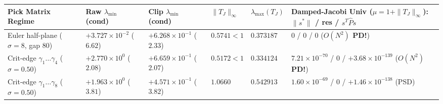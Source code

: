 \documentclass[
  11pt,
]{article}
\newcounter{none} %
\begin{document}
\begin{enumerate}
  {\def\LTcaptype{none} %
  \begin{longtable}[]{@{}
    >{\raggedright\arraybackslash}p{}
    >{\centering\arraybackslash}p{}
    >{\centering\arraybackslash}p{}
    >{\centering\arraybackslash}p{}
    >{\centering\arraybackslash}p{}
    >{\centering\arraybackslash}p{}@{}}
  \toprule\noalign{}
  \begin{minipage}[b]{\linewidth}\raggedright
  Pick Matrix Regime
  \end{minipage} & \begin{minipage}[b]{\linewidth}\centering
  Raw \(\lambda_{\min}\) (cond)
  \end{minipage} & \begin{minipage}[b]{\linewidth}\centering
  Clip \(\lambda_{\min}\) (cond)
  \end{minipage} & \begin{minipage}[b]{\linewidth}\centering
  \(\|T_J\|_\infty\)
  \end{minipage} & \begin{minipage}[b]{\linewidth}\centering
  \(\lambda_{\max}(T_J)\)
  \end{minipage} & \begin{minipage}[b]{\linewidth}\centering
  Damped-Jacobi Univ (\(\mu = 1 + \|T_J\|_\infty\)): \(\|s^*\|\) / res /
  \(s^T \widehat{P} s\)
  \end{minipage} \\
  \midrule\noalign{}
  \endhead
  \bottomrule\noalign{}
  \endlastfoot
  Euler half-plane (\(\sigma=8\), gap \(80\)) & \(+3.727\times 10^{-2}\)
  (\(6.62\)) & \(+6.268\times 10^{-1}\) (\(2.33\)) &
  \textbf{\(0.5741 < 1\)} & \(0.373187\) & \(0\) / \(0\) / \(0\)
  (\textbf{\(O(N^2)\) PD!}) \\
  Crit-edge \(\gamma_1 \dots \gamma_4\) (\(\sigma=0.50\)) &
  \(+2.770\times 10^0\) (\(2.08\)) & \(+6.659\times 10^{-1}\) (\(2.07\))
  & \textbf{\(0.5172 < 1\)} & \(0.334124\) & \(7.21\times 10^{-70}\) /
  \(0\) / \(+3.68\times 10^{-139}\) (\textbf{\(O(N^2)\) PD!}) \\
  Crit-edge \(\gamma_1 \dots \gamma_8\) (\(\sigma=0.50\)) &
  \(+1.963\times 10^0\) (\(3.81\)) & \(+4.571\times 10^{-1}\) (\(3.82\))
  & \(1.0660\) & \(0.542913\) & \(1.60\times 10^{-69}\) / \(0\) /
  \(+1.46\times 10^{-138}\) (PSD) \\

\end{longtable}}
\end{enumerate}
\end{document}
